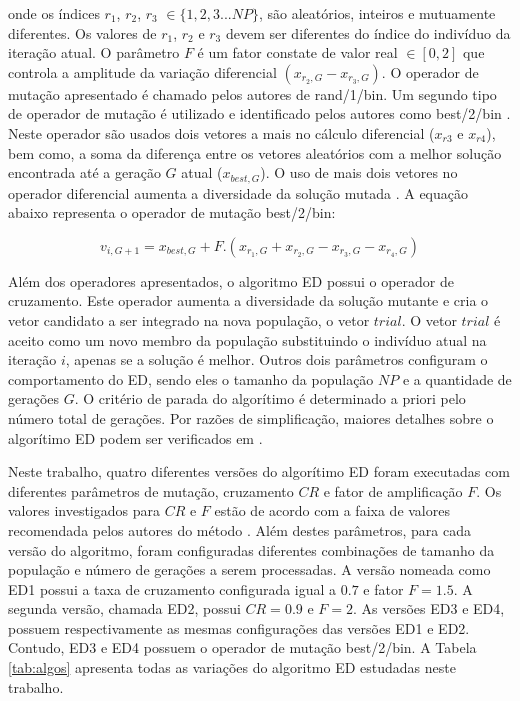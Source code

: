 \documentclass[12pt,A4,A4pt]{article}
\begin{document}
onde os índices $r_{1}$, $r_{2}$, $r_{3}$ $\in \{1,2,3 ...NP\}$, são aleatórios, inteiros e mutuamente diferentes. Os valores de $r_{1}$, $r_{2}$ e $r_{3}$ devem ser diferentes do índice do indivíduo da iteração atual. O parâmetro $F$ é um fator constate de valor real $\in [0,2]$ que controla a amplitude da variação diferencial $(x_{r_{2},G} - x_{r_{3},G})$. O operador de mutação apresentado é chamado pelos autores de rand/1/bin. Um segundo tipo de operador de mutação é utilizado e identificado pelos autores como best/2/bin \citep{Storn1997}. Neste operador são usados dois vetores a mais no cálculo diferencial ($x_{r3}$ e $x_{r4}$), bem como, a soma da diferença entre os vetores aleatórios com a melhor solução encontrada até a geração $G$ atual ($x_{{best},G}$). O uso de mais dois vetores no operador diferencial aumenta a diversidade da solução mutada \citep{Storn1997}. A equação abaixo representa o operador de mutação best/2/bin:

\begin{equation}
v_{i,G+1} = x_{{best},G} + F . (x_{r_{1},G} + x_{r_{2},G} - x_{r_{3},G} - x_{r_{4},G}) \label{trial2}
\end{equation}


Além dos operadores apresentados, o algoritmo ED possui o operador de cruzamento. Este operador aumenta a diversidade da solução mutante e cria o vetor candidato a ser integrado na nova população, o vetor $trial$. O vetor $trial$ é aceito como um novo membro da população substituindo o indivíduo atual na iteração $i$, apenas se a solução é melhor. Outros dois parâmetros configuram o comportamento do ED, sendo eles o tamanho da população $NP$ e a quantidade de gerações $G$. O critério de parada do algorítimo é determinado a priori pelo número total de gerações. Por razões de simplificação, maiores detalhes sobre o algorítimo ED podem ser verificados em \cite{Storn1997}.

Neste trabalho, quatro diferentes versões do algorítimo ED foram executadas com diferentes parâmetros de mutação, cruzamento $CR$ e fator de amplificação $F$. Os valores investigados para $CR$ e $F$ estão de acordo com a faixa de  valores recomendada pelos autores do método \citep{Storn1997}. Além destes parâmetros, para cada versão do algoritmo, foram configuradas diferentes combinações de tamanho da população e número de gerações a serem processadas. A versão nomeada como ED1 possui a taxa de cruzamento  configurada igual a $0.7$ e fator $F = 1.5$. A segunda versão, chamada ED2, possui $CR = 0.9$ e $F = 2$. As versões ED3 e
ED4, possuem respectivamente as mesmas configurações das versões ED1 e ED2. Contudo, ED3 e ED4 possuem o operador de mutação best/2/bin. A Tabela \ref{tab:algos} apresenta todas as variações do algoritmo ED estudadas neste trabalho.
\end{document}
